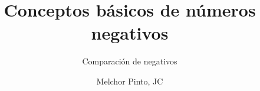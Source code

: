 \documentclass{guia}
\title{Conceptos básicos de números negativos}
\subtitle{Comparación de negativos}
\author{Melchor Pinto, JC}
\begin{document}
%
\begin{questions}
\questionboxed{}
\end{questions}
\end{document}
